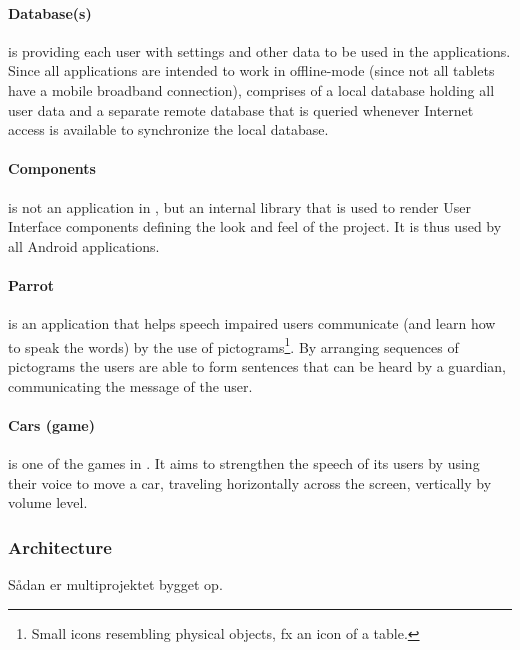 \paragraph{Database(s)}
is providing each user with settings and other data to be used in the \giraf applications.
Since all applications are intended to work in offline-mode (since not all tablets have a mobile broadband connection), \giraf comprises of a local database holding all user data and a separate remote database that is queried whenever Internet access is available to synchronize the local database. 

\paragraph{\giraf Components}
is not an application in \giraf, but an internal library that is used to render User Interface components defining the look and feel of the project.
It is thus used by all Android applications.

\paragraph{Parrot}
is an application that helps speech impaired users communicate (and learn how to speak the words) by the use of pictograms\footnote{Small icons resembling physical objects, fx an icon of a table.}.
By arranging sequences of pictograms the users are able to form sentences that can be heard by a guardian, communicating the message of the user.

\paragraph{Cars (game)}
is one of the games in \giraf.
It aims to strengthen the speech of its users by using their voice to move a car, traveling horizontally across the screen, vertically by volume level.


\subsubsection{Architecture}

Sådan er multiprojektet bygget op.

